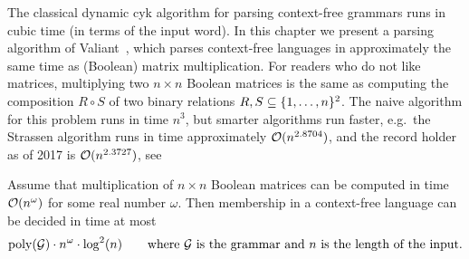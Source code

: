 The classical dynamic {\sc cyk} algorithm for parsing context-free grammars runs in cubic time (in terms of the input word). 
In this chapter we present a parsing algorithm of  Valiant~\cite{Valiant:1975bn}, which parses  context-free languages  in approximately the same time as (Boolean) matrix multiplication.  For readers who do not like matrices, multiplying two $n \times n$  Boolean matrices  is the same as computing the composition $R \circ S$ of two  binary relations $R,S \subseteq \{1,\ldots,n\}^2$.
The naive algorithm for this problem runs in time $n^3$, but smarter algorithms run faster, e.g.~the Strassen algorithm runs in time approximately $\mathcal{O}(n^{2.8704})$, and the record holder as of  2017 is $\mathcal{O}(n^{2.3727})$, see~\cite{Williams:2012gs}

\begin{theorem}
	\label{thm:valiant}
	Assume that  multiplication of $n \times n$ Boolean matrices can be computed in time $\mathcal{O}(n^\omega)$ for some real number $\omega$. Then membership in a context-free language can be decided in time at most
	\begin{align*}
\mathrm{poly}(\mathcal{G}) \cdot n^\omega \cdot \log^2(n) \qquad \text{where $\mathcal{G}$ is the grammar and $n$ is the length of the input.}\end{align*}
\end{theorem}

